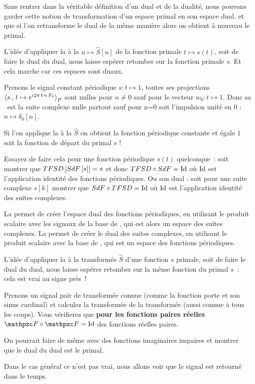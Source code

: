 Sans rentrer dans la véritable définition d'un dual et de la dualité,
nous pouvons garder cette notion de transformation d'un espace primal
en son espace dual, et que si l'on retransforme le dual de la même
manière alors on obtient à nouveau le primal. 

L'idée d'appliquer la \TFSD{} à la \sdf{} $n\mapsto \hat{S}[n]$ de la
fonction primale $t\mapsto s(t)$, soit de faire le dual du dual, nous
laisse espérer retomber sur la fonction primale $s$. Et cela marche
car ces espaces sont duaux.

\begin{exercice}
  Prenons le signal constant périodique $s : t\mapsto 1$, toutes ses
  projections $\langle s\,,\,t\mapsto e^{i2\pi\,t\,n\,F_0}{\rangle}_P$ sont nulles
  pour $n\neq0$ sauf pour le vecteur $w_0 : t\mapsto 1$. Donc sa
  \sdf{} est la suite complexe nulle partout sauf pour n=0 soit
  l'impulsion unité en 0 : $n\mapsto\delta_0[n]$.

  Si l'on applique la \TFSD{} à la \sdf{} $\hat{S}$ on obtient la
  fonction périodique constante et égale $1$ soit la fonction de
  départ du primal $s$ !

  Essayez de faire cela pour une fonction périodique $s(t)$
  quelconque~: soit montrer que $TFSD{}\left[SdF{}\left[s\right]\right]=s$ et donc
  $TFSD{} \circ SdF{} = \mathrm{Id}$ où $\mathrm{Id}$ est l'application identité des
  fonctions périodiques.  Ou son dual : soit pour une suite complexe
  $s[k]$ montrer que $SdF \circ TFSD = \mathrm{Id}$ où $\mathrm{Id}$ est
  l'application identité des suites complexes.
  
\end{exercice}


La \sdf{} permet de créer l'espace dual des fonctions périodiques, en
utilisant le produit scalaire avec les signaux de la base de \Fourier,
qui est alors un espace des suites complexes. La \TFSD{} permet de
créer le dual des suites complexes, en utilisant le produit scalaire
avec la base de \Fourier, qui est un espace des fonctions
périodiques.

L'idée d'appliquer la \TF{} à la transformée $\hat{S}$ d'une fonction
$s$ primale, soit de faire le dual du dual, nous laisse espérer
retomber sur la même fonction du primal $s$~: cela est vrai au signe
près~!


\begin{exercice}
  Prenons un signal pair de transformée connue (comme la fonction
  porte et son sinus cardinal) et calculez la transformée de la
  transformée (aussi connue à tous les coups). Vous vérifierez que
  \textbf{pour les fonctions paires réelles} $\F{}\circ\F{}=\Id$ des
  fonctions réelles paires.

  On pourrait faire de même avec des fonctions imaginaires impaires et
  montrer que le dual du dual est le primal.

  Dans le cas général ce n'est pas vrai, nous allons voir que le
  signal est retourné dans le temps.
  
\end{exercice}


